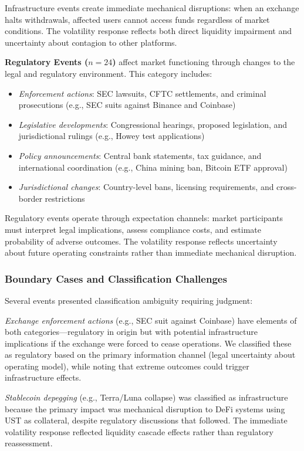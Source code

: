 \documentclass[pdflatex,sn-mathphys-num]{sn-jnl}
\theoremstyle{thmstyleone}
\theoremstyle{thmstyletwo}
\theoremstyle{thmstylethree}
\begin{document}
Infrastructure events create immediate mechanical disruptions: when an exchange halts withdrawals, affected users cannot access funds regardless of market conditions. The volatility response reflects both direct liquidity impairment and uncertainty about contagion to other platforms.

\textbf{Regulatory Events ($n=24$)} affect market functioning through changes to the legal and regulatory environment. This category includes:
\begin{itemize}[nosep]
\item \textit{Enforcement actions}: SEC lawsuits, CFTC settlements, and criminal prosecutions (e.g., SEC suits against Binance and Coinbase)
\item \textit{Legislative developments}: Congressional hearings, proposed legislation, and jurisdictional rulings (e.g., Howey test applications)
\item \textit{Policy announcements}: Central bank statements, tax guidance, and international coordination (e.g., China mining ban, Bitcoin ETF approval)
\item \textit{Jurisdictional changes}: Country-level bans, licensing requirements, and cross-border restrictions
\end{itemize}

Regulatory events operate through expectation channels: market participants must interpret legal implications, assess compliance costs, and estimate probability of adverse outcomes. The volatility response reflects uncertainty about future operating constraints rather than immediate mechanical disruption.

\subsubsection{Boundary Cases and Classification Challenges}

Several events presented classification ambiguity requiring judgment:

\textit{Exchange enforcement actions} (e.g., SEC suit against Coinbase) have elements of both categories---regulatory in origin but with potential infrastructure implications if the exchange were forced to cease operations. We classified these as regulatory based on the primary information channel (legal uncertainty about operating model), while noting that extreme outcomes could trigger infrastructure effects.

\textit{Stablecoin depegging} (e.g., Terra/Luna collapse) was classified as infrastructure because the primary impact was mechanical disruption to DeFi systems using UST as collateral, despite regulatory discussions that followed. The immediate volatility response reflected liquidity cascade effects rather than regulatory reassessment.
\end{document}
